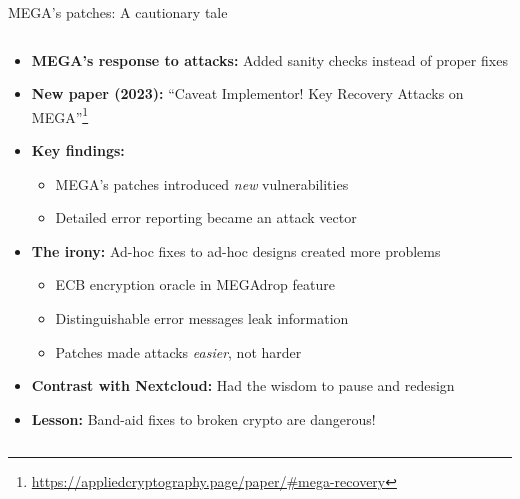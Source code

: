 \documentclass[aspectratio=169, lualatex, handout]{beamer}
\begin{document}
\begin{frame}{MEGA's patches: A cautionary tale}
	\begin{columns}[c]
		\begin{column}{1\textwidth}
			\begin{itemize}
				\item \textbf{MEGA's response to attacks:} Added sanity checks instead of proper fixes
				\item \textbf{New paper (2023):} ``Caveat Implementor! Key Recovery Attacks on MEGA''\footnote{\url{https://appliedcryptography.page/paper/\#mega-recovery}}
				\item \textbf{Key findings:}
				      \begin{itemize}
					      \item MEGA's patches introduced \textit{new} vulnerabilities
					      \item Detailed error reporting became an attack vector
				      \end{itemize}
				\item \textbf{The irony:} Ad-hoc fixes to ad-hoc designs created more problems
				      \begin{itemize}
					      \item ECB encryption oracle in MEGAdrop feature
					      \item Distinguishable error messages leak information
					      \item Patches made attacks \textit{easier}, not harder
				      \end{itemize}
				\item \textbf{Contrast with Nextcloud:} Had the wisdom to pause and redesign
				\item \textbf{Lesson:} Band-aid fixes to broken crypto are dangerous!
			\end{itemize}
		\end{column}
	\end{columns}
\end{frame}
\end{document}
